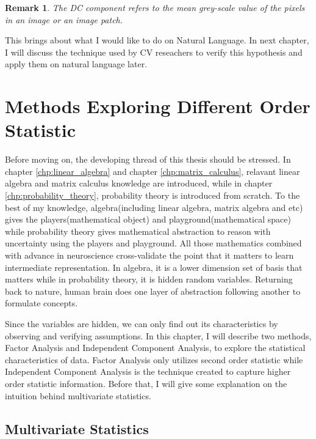 \documentclass[a4paper]{book}
\newtheorem{remark}{Remark}[section]
\begin{document}
    \begin{remark}
      The DC component refers to the mean grey-scale value of the pixels
      in an image or an image patch.
    \end{remark}

    This brings about what I would like to do on Natural Language. In
    next chapter, I will discuss the technique used by CV reseachers to
    verify this hypothesis and apply them on natural language later.


\chapter{Methods Exploring Different Order Statistic}
\label{chp:exploring_different_stat}

Before moving on, the developing thread of this thesis should be
stressed. In chapter \ref{chp:linear_algebra} and chapter
\ref{chp:matrix_calculus}, relavant linear algebra and matrix calculus
knowledge are introduced, while in chapter \ref{chp:probability_theory},
probability theory is introduced from scratch. To the best of my
knowledge, algebra(including linear algebra, matrix algebra and etc)
gives the players(mathematical object) and playground(mathematical
space) while probability theory gives mathematical abstraction to reason
with uncertainty using the players and playground. All those mathematics
combined with advance in neuroscience cross-validate the point that it
matters to learn intermediate representation. In algebra, it is a lower
dimension set of basis that matters while in probability theory, it is
hidden random variables. Returning back to nature, human brain does one
layer of abstraction following another to formulate concepts.

Since the variables are hidden, we can only find out its characteristics by
observing and verifying assumptions. In this chapter, I will describe
two methods, Factor Analysis and Independent Component Analysis, to
explore the statistical characteristics of data. Factor Analysis only
utilizes second order statistic while Independent Component Analysis is
the technique created to capture higher order statistic information.
Before that, I will give some explanation on the intuition behind
multivariate statistics.

  \section{Multivariate Statistics}
\end{document}
